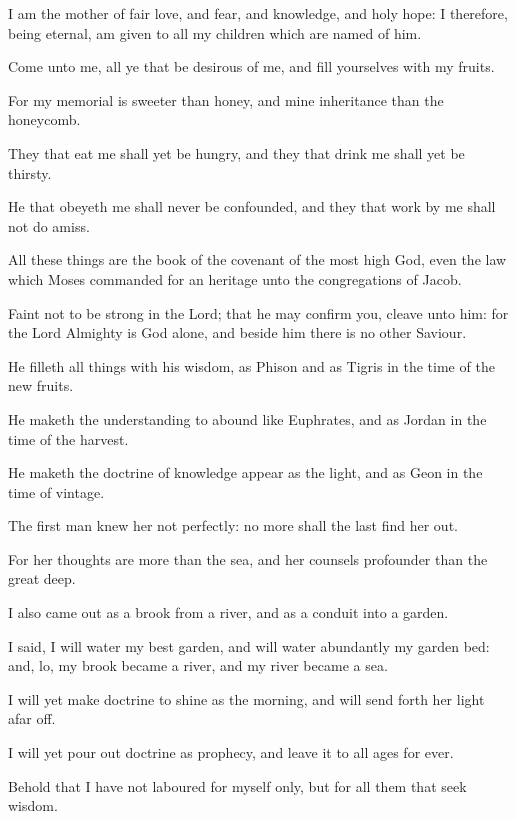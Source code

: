 {\par }{\PP {}I am the mother of fair love, and fear, and knowledge, and holy hope: I therefore, being eternal, am given to all my children which are named of him.
\par }{\PP {}Come unto me, all ye that be desirous of me, and fill yourselves with my fruits.
\par }{\PP {}For my memorial is sweeter than honey, and mine inheritance than the honeycomb.
\par }{\PP {}They that eat me shall yet be hungry, and they that drink me shall yet be thirsty.
\par }{\PP {}He that obeyeth me shall never be confounded, and they that work by me shall not do amiss.
\par }{\PP {}All these things are the book of the covenant of the most high God, even the law which Moses commanded for an heritage unto the congregations of Jacob.
\par }{\PP {}Faint not to be strong in the Lord; that he may confirm you, cleave unto him: for the Lord Almighty is God alone, and beside him there is no other Saviour.
\par }{\PP {}He filleth all things with his wisdom, as Phison and as Tigris in the time of the new fruits.
\par }{\PP {}He maketh the understanding to abound like Euphrates, and as Jordan in the time of the harvest.
\par }{\PP {}He maketh the doctrine of knowledge appear as the light, and as Geon in the time of vintage.
\par }{\PP {}The first man knew her not perfectly: no more shall the last find her out.
\par }{\PP {}For her thoughts are more than the sea, and her counsels profounder than the great deep.
\par }{\PP {}I also came out as a brook from a river, and as a conduit into a garden.
\par }{\PP {}I said, I will water my best garden, and will water abundantly my garden bed: and, lo, my brook became a river, and my river became a sea.
\par }{\PP {}I will yet make doctrine to shine as the morning, and will send forth her light afar off.
\par }{\PP {}I will yet pour out doctrine as prophecy, and leave it to all ages for ever.
\par }{\PP {}Behold that I have not laboured for myself only, but for all them that seek wisdom.

}
